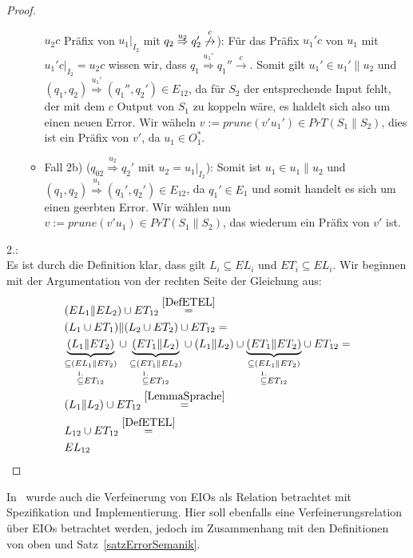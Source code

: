 \begin{proof}
\begin{itemize}
\begin{itemize}
        $u_2c$ Präfix von $u_1|_{I_2}$ mit $q_2 \overset{u_2}{\Rightarrow} q_2'
        \overset{c}{\not{\hspace{-0.1cm}\rightarrow}}$): Für das Präfix $u_1'c$
        von $u_1$ mit $u_1'c|_{I_2}=u_2c$ wissen wir, dass $q_1
        \overset{u_1'}{\Rightarrow} q_1'' \overset{c}{\rightarrow}$. Somit gilt
        $u_1'\in u_1'\|u_2$ und $(q_1,q_2) \overset{u_1'}{\Rightarrow}
        (q_1'',q_2')\in E_{12}$, da für $S_2$ der entsprechende Input fehlt,
        der mit dem $c$ Output von $S_1$ zu koppeln wäre, es haldelt sich also
        um einen neuen Error. Wir wäheln $v:=prune(v'u_1')\in PrT(S_1\| S_2)$,
        dies ist ein Präfix von $v'$, da $u_1\in O_1^*$.
      \item Fall 2b) ($q_{02} \overset{u_2}{\Rightarrow} q_2'$ mit
        $u_2=u_1|_{I_2}$): Somit ist $u_1\in u_1\|u_2$ und $(q_1,q_2)
        \overset{u_1}{\Rightarrow} (q_1',q_2')\in E_{12}$, da $q_1'\in E_1$ und
        somit handelt es sich um einen geerbten Error. Wir wählen nun $v:=prune
        (v'u_1)\in PrT(S_1\|S_2)$, das wiederum ein Präfix von $v'$ ist.
    \end{itemize}
  \end{itemize}

  2.:\\
  Es ist durch die Definition klar, dass gilt $L_i\subseteq EL_i$ und
  $ET_i\subseteq EL_i$. Wir beginnen mit der Argumentation von der rechten
  Seite der Gleichung aus:
  \begin{align*}
    &(EL_1\| EL_2)\cup ET_{12}\overset{\ref{DefETEL}}{=}\\
    &(L_1\cup ET_1)\|(L_2\cup ET_2)\cup ET_{12}=\\
    &\underset{\overset{1.}{\subseteq} ET_{12}}{\underset{\subseteq
    (EL_1\|ET_2)}{\underbrace{(L_1\|ET_2)}}} \cup
    \underset{\overset{1.}{\subseteq} ET_{12}}{\underset{\subseteq
    (ET_1\|EL_2)}{\underbrace{(ET_1\|L_2)}}} \cup
    (L_1\|L_2) \cup \underset{\overset{1.}{\subseteq}
    ET_{12}}{\underset{\subseteq (EL_1\|ET_2)}{\underbrace{(ET_1\|ET_2)}}} \cup
    ET_{12}=\\
    &(L_1\|L_2) \cup ET_{12}\overset{\ref{LemmaSprache}}{=}\\
    &L_{12}\cup ET_{12}\overset{\ref{DefETEL}}{=}\\
    &EL_{12}
  \end{align*}
\end{proof}

In~\cite{Vogler2014EIO} wurde auch die Verfeinerung von EIOs als Relation betrachtet
mit Spezifikation und Implementierung. Hier soll ebenfalls eine
Verfeinerungsrelation über EIOs betrachtet werden, jedoch im Zusammenhang mit
den Definitionen von oben und Satz~\ref{satzErrorSemanik}.

